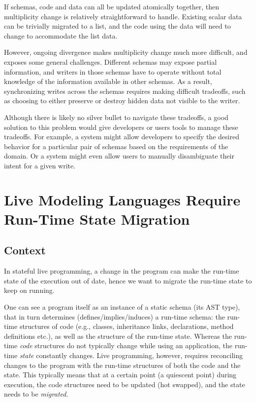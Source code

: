 \documentclass[english,submission]{programming}
\begin{document}
If schemas, code and data can all be updated atomically together, then multiplicity change is relatively straightforward  to handle. Existing scalar data can be trivially migrated to a list, and the code using the data will need to change to accommodate the list data.

However, ongoing divergence makes multiplicity change much more difficult, and exposes some general challenges. Different schemas may expose partial information, and writers in those schemas have to operate without total knowledge of the information available in other schemas. As a result, synchronizing writes across the schemas requires making difficult tradeoffs, such as choosing to either preserve or destroy hidden data not visible to the writer.

Although there is likely no silver bullet to navigate these tradeoffs, a good solution to this problem would give developers or users tools to manage these tradeoffs. For example, a system might allow developers to specify the desired behavior for a particular pair of schemas based on the requirements of the domain. Or a system might even allow users to manually disambiguate their intent for a given write.


\newpage

\section{Live Modeling Languages Require Run-Time State Migration}
\label{livemodeling}

\subsection{Context}
In stateful live programming, a change in the program can make the run-time state of the execution out of date, hence we want to migrate the run-time state to keep on running.

One can see a program itself as an instance of a static schema (its AST type), that in turn determines (defines/implies/induces) a run-time schema: the run-time structures of code (e.g., classes, inheritance links, declarations, method definitions etc.), as well as the structure of the run-time state. Whereas the run-time \textit{code} structures do not typically change while using an application, the run-time \textit{state} constantly changes.
Live programming, however, requires reconciling changes to the program with the run-time structures of both the code and the state. This typically means that at a certain point (a quiescent point) during execution, the code structures need to be updated (hot swapped), and the state needs to be \textit{migrated}.
\end{document}
